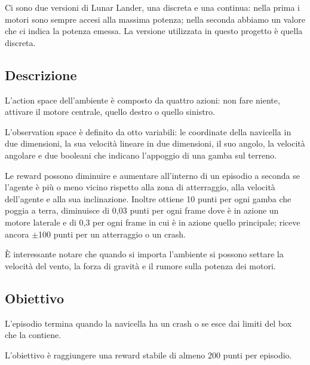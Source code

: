 Ci sono due versioni di Lunar Lander, una discreta e una continua: nella prima i motori sono sempre accesi alla massima potenza; nella seconda abbiamo un valore che ci indica la potenza emessa. La versione utilizzata in questo progetto è quella discreta.

\subsection{Descrizione}
L'action space dell'ambiente è composto da quattro azioni: non fare niente, attivare il motore centrale, quello destro o quello sinistro.

L'observation space è definito da otto variabili: le coordinate della navicella in due dimensioni, la sua velocità lineare in due dimensioni, il suo angolo, la velocità angolare e due booleani che indicano l'appoggio di una gamba sul terreno.

Le reward possono diminuire e aumentare all'interno di un episodio a seconda se l'agente è più o meno vicino rispetto alla zona di atterraggio, alla velocità dell'agente e alla sua inclinazione. Inoltre ottiene 10 punti per ogni gamba che poggia a terra, diminuisce di 0,03 punti per ogni frame dove è in azione un motore laterale e di 0,3 per ogni frame in cui è in azione quello principale; riceve ancora $\pm$100 punti per un atterraggio o un crash.

È interessante notare che quando si importa l'ambiente si possono settare la velocità del vento, la forza di gravità e il rumore sulla potenza dei motori.

\subsection{Obiettivo}
L'episodio termina quando la navicella ha un crash o se esce dai limiti del box che la contiene.

L'obiettivo è raggiungere una reward stabile di almeno 200 punti per episodio.
